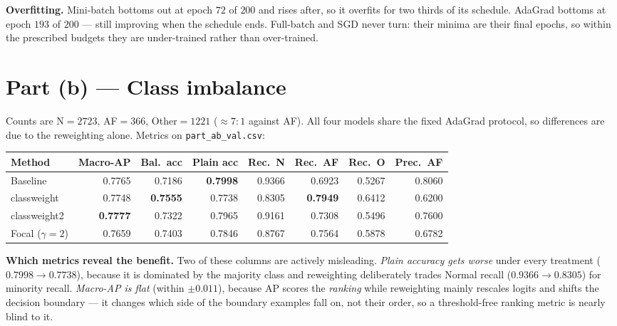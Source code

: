 \documentclass[10pt,a4paper]{article}
\begin{document}
\textbf{Overfitting.} Mini-batch bottoms out at epoch $72$ of $200$ and rises
after, so it overfits for two thirds of its schedule. AdaGrad bottoms at epoch
$193$ of $200$ --- still improving when the schedule ends. Full-batch and SGD
never turn: their minima are their final epochs, so within the prescribed budgets
they are under-trained rather than over-trained.

\section*{Part (b) --- Class imbalance}

Counts are N${=}2723$, AF${=}366$, Other${=}1221$ ($\approx 7{:}1$ against AF).
All four models share the fixed AdaGrad protocol, so differences are due to the
reweighting alone. Metrics on \texttt{part\_ab\_val.csv}:

\begin{table}[h]
\centering\footnotesize
\begin{tabular}{@{}lrrrrrrr@{}}
\toprule
\textbf{Method} & \textbf{Macro-AP} & \textbf{Bal.\ acc} & \textbf{Plain acc}
& \textbf{Rec.\ N} & \textbf{Rec.\ AF} & \textbf{Rec.\ O} & \textbf{Prec.\ AF} \\
\midrule
Baseline       & 0.7765 & 0.7186 & \textbf{0.7998} & 0.9366 & 0.6923 & 0.5267 & 0.8060 \\
classweight    & 0.7748 & \textbf{0.7555} & 0.7738 & 0.8305 & \textbf{0.7949} & 0.6412 & 0.6200 \\
classweight2   & \textbf{0.7777} & 0.7322 & 0.7965 & 0.9161 & 0.7308 & 0.5496 & 0.7600 \\
Focal ($\gamma{=}2$) & 0.7659 & 0.7403 & 0.7846 & 0.8767 & 0.7564 & 0.5878 & 0.6782 \\
\bottomrule
\end{tabular}
\end{table}

\textbf{Which metrics reveal the benefit.} Two of these columns are actively
misleading. \emph{Plain accuracy gets worse} under every treatment
($0.7998 \to 0.7738$), because it is dominated by the majority class and
reweighting deliberately trades Normal recall ($0.9366 \to 0.8305$) for minority
recall. \emph{Macro-AP is flat} (within $\pm0.011$), because AP scores the
\emph{ranking} while reweighting mainly rescales logits and shifts the decision
boundary --- it changes which side of the boundary examples fall on, not their
order, so a threshold-free ranking metric is nearly blind to it.
\end{document}
